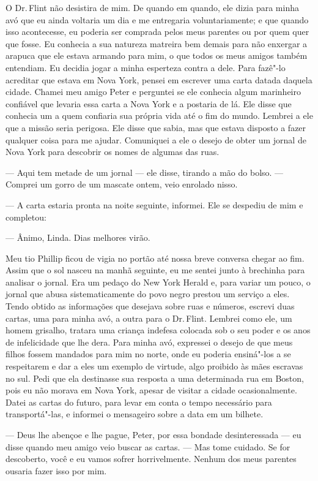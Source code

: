 O Dr.\,Flint não desistira de mim. De
quando em quando, ele dizia para minha avó que eu ainda voltaria um dia
e me entregaria voluntariamente; e que quando isso acontecesse, eu
poderia ser comprada pelos meus parentes ou por quem quer que fosse. Eu
conhecia a sua natureza matreira bem demais para não enxergar a arapuca
que ele estava armando para mim, o que todos os meus amigos também
entendiam. Eu decidia jogar a minha esperteza contra a dele. Para
fazê"-lo acreditar que estava em Nova York, pensei em escrever uma carta
datada daquela cidade. Chamei meu amigo Peter e perguntei se ele
conhecia algum marinheiro confiável que levaria essa carta a Nova York e
a postaria de lá. Ele disse que conhecia um a quem confiaria sua própria
vida até o fim do mundo. Lembrei a ele que a missão seria perigosa. Ele
disse que sabia, mas que estava disposto a fazer qualquer coisa para me
ajudar. Comuniquei a ele o desejo de obter um jornal de Nova York para
descobrir os nomes de algumas das ruas.

--- Aqui tem metade de um jornal --- ele disse, tirando a mão do bolso.
--- Comprei um gorro de um mascate ontem, veio enrolado nisso.

--- A carta estaria pronta na noite seguinte, informei. Ele se despediu
de mim e completou:

--- Ânimo, Linda. Dias melhores virão.

Meu tio Phillip ficou de vigia no
portão até nossa breve conversa chegar ao fim. Assim que o sol nasceu na
manhã seguinte, eu me sentei junto à brechinha para analisar o jornal.
Era um pedaço do New York Herald e, para variar um pouco, o jornal que
abusa sistematicamente do povo negro prestou um serviço a eles. Tendo
obtido as informações que desejava sobre ruas e números, escrevi duas
cartas, uma para minha avó, a outra para o Dr.\,Flint. Lembrei como ele,
um homem grisalho, tratara uma criança indefesa colocada sob o seu poder
e os anos de infelicidade que lhe dera. Para minha avó, expressei o
desejo de que meus filhos fossem mandados para mim no norte, onde eu
poderia ensiná"-los a se respeitarem e dar a eles um exemplo de virtude,
algo proibido às mães escravas no sul. Pedi que ela destinasse sua
resposta a uma determinada rua em Boston, pois eu não morava em Nova
York, apesar de visitar a cidade ocasionalmente. Datei as cartas do
futuro, para levar em conta o tempo necessário para transportá"-las, e
informei o mensageiro sobre a data em um bilhete.

--- Deus lhe abençoe e lhe pague, Peter, por essa bondade desinteressada
--- eu disse quando meu amigo veio buscar as cartas. --- Mas tome
cuidado. Se for descoberto, você e eu vamos sofrer horrivelmente. Nenhum
dos meus parentes ousaria fazer isso por mim.

